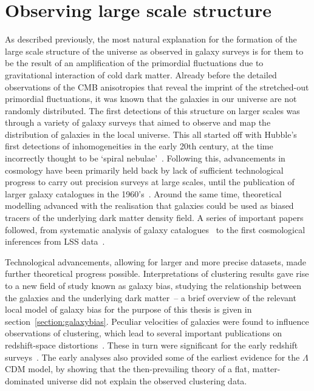 \section{Observing large scale structure}

As described previously, the most natural explanation for the formation of the large scale structure of the universe as observed in galaxy surveys is for them to be the result of an amplification of the primordial fluctuations due to gravitational interaction of cold dark matter. Already before the detailed observations of the CMB anisotropies that reveal the imprint of the stretched-out primordial fluctuations, it was known that the galaxies in our universe are not randomly distributed. The first detections of this structure on larger scales was through a variety of galaxy surveys that aimed to observe and map the distribution of galaxies in the local universe. This all started off with Hubble's first detections of inhomogeneities in the early 20th century, at the time incorrectly thought to be `spiral nebulae'~\cite{Hubble:1926,Hubble:1934}. Following this, advancements in cosmology have been primarily held back by lack of sufficient technological progress to carry out precision surveys at large scales, until the publication of larger galaxy catalogues in the 1960's~\cite{Shane:1967,Zwicky:1961}. Around the same time, theoretical modelling advanced with the realisation that galaxies could be used as biased tracers of the underlying dark matter density field. A series of important papers followed, from systematic analysis of galaxy catalogues~\cite{Peebles:1973} to the first cosmological inferences from LSS data~\cite{Zeldovich:1970,Davis:1977mar,Davis:1977aug,Davis:1983,Peebles:1980,Maddox:1990,Baumgart:1991,Park:1992}. 

Technological advancements, allowing for larger and more precise datasets, made further theoretical progress possible. Interpretations of clustering results gave rise to a new field of study known as galaxy bias, studying the relationship between the galaxies and the underlying dark matter~\cite{Davis:1985,Rees:1985,Cole:1989vx,Kaiser:1984}-- a brief overview of the relevant local model of galaxy bias for the purpose of this thesis is given in section~\ref{section:galaxybias}. Peculiar velocities of galaxies were found to influence observations of clustering, which lead to several important publications on redshift-space distortions~\cite{Kaiser:1987qv,Davis:1983,Hamilton:1992zz}. These in turn were significant for the early redshift surveys~\cite{Cole:1994wf,Loveday:1995gk,Tadros:1999ky}. The early analyses also provided some of the earliest evidence for the $\Lambda$CDM model, by showing that the then-prevailing theory of a flat, matter-dominated universe did not explain the observed clustering data.

